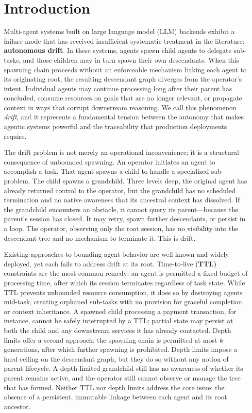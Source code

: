 \section{Introduction}

Multi-agent systems built on large language model (LLM) backends exhibit a failure mode that has received insufficient systematic treatment in the literature: \textbf{autonomous drift}. In these systems, agents spawn child agents to delegate sub-tasks, and those children may in turn spawn their own descendants. When this spawning chain proceeds without an enforceable mechanism linking each agent to its originating root, the resulting descendant graph diverges from the operator's intent. Individual agents may continue processing long after their parent has concluded, consume resources on goals that are no longer relevant, or propagate context in ways that corrupt downstream reasoning. We call this phenomenon \emph{drift}, and it represents a fundamental tension between the autonomy that makes agentic systems powerful and the traceability that production deployments require.

The drift problem is not merely an operational inconvenience; it is a structural consequence of unbounded spawning. An operator initiates an agent to accomplish a task. That agent spawns a child to handle a specialized sub-problem. The child spawns a grandchild. Three levels deep, the original agent has already returned control to the operator, but the grandchild has no scheduled termination and no native awareness that its ancestral context has dissolved. If the grandchild encounters an obstacle, it cannot query its parent—because the parent's session has closed. It may retry, spawn further descendants, or persist in a loop. The operator, observing only the root session, has no visibility into the descendant tree and no mechanism to terminate it. This is drift.

Existing approaches to bounding agent behavior are well-known and widely deployed, yet each fails to address drift at its root. Time-to-live (\textbf{TTL}) constraints are the most common remedy: an agent is permitted a fixed budget of processing time, after which its session terminates regardless of task state. While TTL prevents unbounded resource consumption, it does so by destroying agents mid-task, creating orphaned sub-tasks with no provision for graceful completion or context inheritance. A spawned child processing a payment transaction, for instance, cannot be safely interrupted by a TTL; partial state may persist at both the child and any downstream services it has already contacted. Depth limits offer a second approach: the spawning chain is permitted at most $k$ generations, after which further spawning is prohibited. Depth limits impose a hard ceiling on the descendant graph, but they do so without any notion of parent lifecycle. A depth-limited grandchild still has no awareness of whether its parent remains active, and the operator still cannot observe or manage the tree that has formed. Neither TTL nor depth limits address the core issue: the absence of a persistent, immutable linkage between each agent and its root ancestor.

